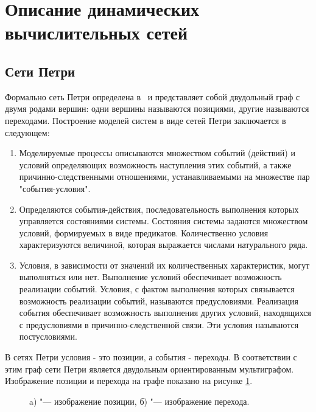 \section{Описание динамических вычислительных сетей}
  \subsection{Сети Петри}
  
	  Формально сеть Петри определена в~\cite{piterson} и представляет собой двудольный граф с двумя родами вершин: одни вершины называются позициями, другие называются переходами. 
	  Построение моделей систем в виде сетей Петри заключается в следующем:
	  \begin{enumerate}
	  	\item 	Моделируемые процессы описываются множеством событий (действий) и условий определяющих возможность наступления этих событий, а также причинно-следственными отношениями, устанавливаемыми на множестве пар "события-условия".
	  	\item Определяются события-действия, последовательность выполнения которых управляется состояниями системы. Состояния системы задаются множеством условий, формируемых в виде предикатов. Количественно условия характеризуются величиной, которая выражается числами натурального ряда.
	  	\item Условия, в зависимости от значений их количественных характеристик, могут выполняться или нет. Выполнение условий обеспечивает возможность реализации событий. Условия, с фактом выполнения которых связывается возможность реализации событий, называются предусловиями. Реализация события обеспечивает возможность выполнения других условий, находящихся с предусловиями в причинно-следственной связи. Эти условия называются постусловиями.
	  \end{enumerate}

	  В сетях Петри условия - это позиции, а события - переходы. В соответствии с этим граф сети Петри является двудольным ориентированным мультиграфом. Изображение позиции и перехода на графе показано на рисунке \ref{img:example}.
	  
	  \begin{figure}[h!]
	  	\begin{minipage}[ht]{0.49\linewidth}
	  	\end{minipage}
	  	\hfill
	  	\begin{minipage}[ht]{0.49\linewidth}
	  	\end{minipage}
	  	\caption{a) "--- изображение позиции, б) "--- изображение перехода. }
	  	\label{img:example}  
	  \end{figure}
	  
